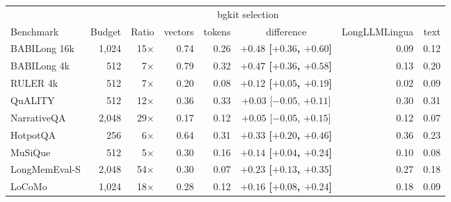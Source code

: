 \begin{tabular}{lrrrrcrr}
\toprule
 & & & \multicolumn{3}{c}{bgkit selection} & & \\
\cmidrule(lr){4-6}
Benchmark & Budget & Ratio & vectors & tokens & difference & LongLLMLingua & text \\
\midrule
BABILong 16k & 1,024 & 15$\times$ & 0.74 & 0.26 & \textbf{$+0.48$ \scriptsize[$+0.36$, $+0.60$]} & 0.09 & 0.12 \\
BABILong 4k & 512 & 7$\times$ & 0.79 & 0.32 & \textbf{$+0.47$ \scriptsize[$+0.36$, $+0.58$]} & 0.13 & 0.20 \\
RULER 4k & 512 & 7$\times$ & 0.20 & 0.08 & \textbf{$+0.12$ \scriptsize[$+0.05$, $+0.19$]} & 0.02 & 0.09 \\
QuALITY & 512 & 12$\times$ & 0.36 & 0.33 & $+0.03$ \scriptsize[$-0.05$, $+0.11$] & 0.30 & 0.31 \\
NarrativeQA & 2,048 & 29$\times$ & 0.17 & 0.12 & $+0.05$ \scriptsize[$-0.05$, $+0.15$] & 0.12 & 0.07 \\
HotpotQA & 256 & 6$\times$ & 0.64 & 0.31 & \textbf{$+0.33$ \scriptsize[$+0.20$, $+0.46$]} & 0.36 & 0.23 \\
MuSiQue & 512 & 5$\times$ & 0.30 & 0.16 & \textbf{$+0.14$ \scriptsize[$+0.04$, $+0.24$]} & 0.10 & 0.08 \\
LongMemEval-S & 2,048 & 54$\times$ & 0.30 & 0.07 & \textbf{$+0.23$ \scriptsize[$+0.13$, $+0.35$]} & 0.27 & 0.18 \\
LoCoMo & 1,024 & 18$\times$ & 0.28 & 0.12 & \textbf{$+0.16$ \scriptsize[$+0.08$, $+0.24$]} & 0.18 & 0.09 \\
\bottomrule
\end{tabular}
